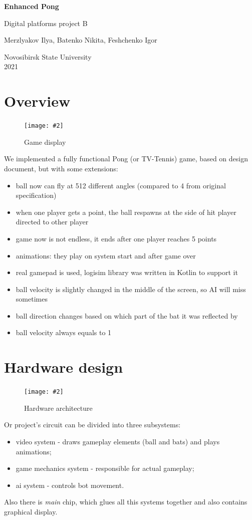\documentclass[12pt,a4paper]{article}
\let\oldsection\section
\renewcommand\section{\clearpage\oldsection}
\newcommand{\dofigure}[3][H]{
    \begin{figure}[#1]
        \centering
        \texttt{[image: \#2]}
        \caption{#3}
    \end{figure}
}
\newcommand{\chip}[1]{{\itshape#1}}
\begin{document}
    \begin{titlepage}
        \begin{center}
            \vspace*{0.3\textheight}

            {\Huge \textbf {Enhanced Pong}}

            {\LARGE Digital platforms project B}

            \vspace{1.5cm}
            Merzlyakov Ilya, Batenko Nikita, Feshchenko Igor

            \vfill
            Novosibirsk State University \\
            2021

        \end{center}
    \end{titlepage}
    \tableofcontents


    \section{Overview}
    \dofigure{main}{Game display}
    We implemented a fully functional Pong (or TV-Tennis) game, based on design document, but with some extensions:\begin{itemize}
        \item ball now can fly at 512 different angles (compared to 4 from original specification)
        \item when one player gets a point, the ball respawns at the side of hit player directed to other player
        \item game now is not endless, it ends after one player reaches 5 points
        \item animations: they play on system start and after game over 
        \item real gamepad is used, logisim library was written in Kotlin to support it
        \item ball velocity is slightly changed in the middle of the screen, so AI will miss sometimes
        \item ball direction changes based on which part of the bat it was reflected by
        \item ball velocity always equals to 1
    \end{itemize}


    \section{Hardware design}
    \dofigure{scheme.png}{Hardware architecture}
    Or project's circuit can be divided into three subsystems:
    \begin{itemize}
        \item video system - draws gameplay elements (ball and bats) and plays animations;
        \item game mechanics system - responsible for actual gameplay;
        \item ai system - controls bot movement.
    \end{itemize}
    Also there is \chip{main} chip, which glues all this systems together and also contains graphical display.
\end{document}
